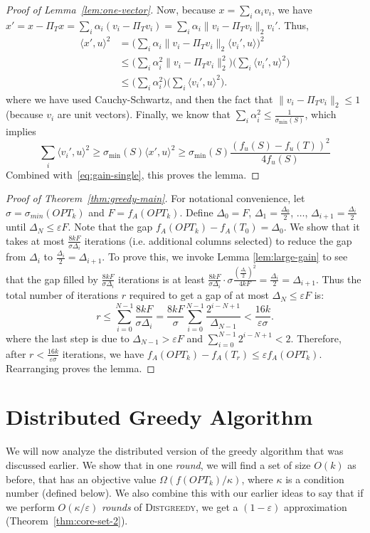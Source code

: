 \documentclass{article}
\newcommand{\eps}{\varepsilon}
\newcommand{\norm}[1]{\lVert #1 \rVert}
\newcommand{\distgreedy}{\textsc{Distgreedy}}
\newcommand{\iprod}[1]{\langle #1 \rangle}
\newcommand{\opt}{OPT}
\begin{document}
\begin{proof}[Proof of Lemma~\ref{lem:one-vector}]
Now, because $x = \sum_i \alpha_i v_i$, we have $x' = x - \Pi_T x = \sum_i \alpha_i(v_i - \Pi_T v_i) = \sum_i \alpha_i\norm{v_i - \Pi_Tv_i}_2v_i'$. Thus,
\begin{align*}
\iprod{x', u}^2 &= 
\big( \sum_i \alpha_i \norm{v_i - \Pi_Tv_i}_2 \iprod{v_i' , u} \big)^2
\\ &\le \big( \sum_i \alpha_i^2 \norm{v_i - \Pi_Tv_i}_2^2 \big) \big( \sum_i \iprod{v_i', u}^2 \big)
\\ &\le \big( \sum_i \alpha_i^2 \big) \big( \sum_i \iprod{v_i', u}^2 \big).
\end{align*}
where we have used Cauchy-Schwartz, and then the fact that $\|v_i - \Pi_Tv_i\|_2 \leq 1$ (because $v_i$ are unit vectors). Finally, we know that $\sum_i \alpha_i^2 \le \frac{1}{\sigma_{\min}(S)}$, which implies 
\[ \sum_i \iprod{v_i', u}^2 \ge \sigma_{\min}(S)  \iprod{x', u}^2 \ge \sigma_{\min}(S) \frac{(f_u(S)- f_u(T))^2}{4f_u(S)}\]
Combined with~\eqref{eq:gain-single}, this proves the lemma. 
\end{proof}


 \begin{proof}[Proof of Theorem~\ref{thm:greedy-main}]
 For notational convenience, let $\sigma = \sigma_{min}(OPT_k)$ and $F = f_A(OPT_k)$. Define $\Delta_0 = F$, $\Delta_1 = \frac{\Delta_0}{2}$, $\dots$, $\Delta_{i+1} = \frac{\Delta_i}{2}$ until $\Delta_N \leq \eps F$. Note that the gap $f_A(OPT_k) - f_A(T_0) = \Delta_0$. We show that it takes at most $\frac{8kF}{\sigma \Delta_i}$ iterations (i.e. additional columns selected) to reduce the gap from $\Delta_i$ to $\frac{\Delta_i}{2} = \Delta_{i+1}$. To prove this, we invoke Lemma \ref{lem:large-gain} to see that the gap filled by $\frac{8kF}{\sigma \Delta_i}$ iterations is at least $\frac{8kF}{\sigma \Delta_i} \cdot \sigma \frac{(\frac{\Delta_i}{2})^2}{4kF}
 = \frac{\Delta_i}{2} = \Delta_{i+1}$. Thus the total number of iterations $r$ required to get a gap of at most $\Delta_N \leq \eps F$ is:
\vspace{-0.1cm}
\[
 r
\leq \sum_{i=0}^{N-1} \frac{8kF}{\sigma \Delta_i}
= \frac{8kF}{\sigma} \sum_{i=0}^{N-1} \frac{2^{i-N+1}}{\Delta_{N-1}} 
< \frac{16k}{\eps \sigma}
.\]
 where the last step is due to $\Delta_{N-1} > \eps F$ and $\sum_{i=0}^{N-1} 2^{i-N+1} < 2$. Therefore, after $r < \frac{16k}{\eps \sigma}$ iterations, we have $f_A(OPT_k) - f_A(T_r) \leq \eps f_A(OPT_k)$. Rearranging proves the lemma.
 \end{proof}


\section{Distributed Greedy Algorithm} \label{section-4}
We will now analyze the distributed version of the greedy algorithm that was discussed earlier. We show that in one {\em round}, we will find a set of size $O(k)$ as before, that has an objective value $\Omega(f(\opt_k)/\kappa)$, where $\kappa$ is a condition number (defined below). We also combine this with our earlier ideas to say that if we perform $O(\kappa / \eps)$ {\em rounds} of \distgreedy, we get a $(1-\eps)$ approximation (Theorem~\ref{thm:core-set-2}).
\end{document}
